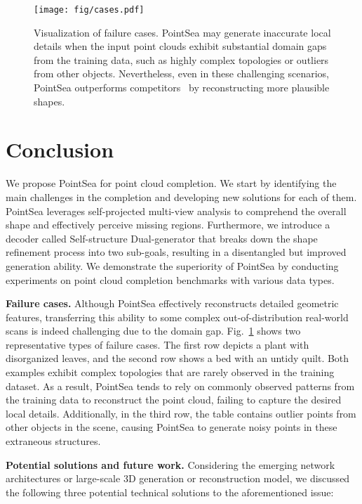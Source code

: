 \begin{figure}[h]
  \centering
  \texttt{[image: fig/cases.pdf]}
\caption{
Visualization of failure cases. PointSea may generate inaccurate local details when the input point clouds exhibit substantial domain gaps from the training data, such as highly complex topologies or outliers from other objects. Nevertheless, even in these challenging scenarios, PointSea outperforms competitors~\citep{chen2023anchorformer,10232862} by reconstructing more plausible shapes.
}
  \label{fig:cases}
\end{figure}


\section{Conclusion}
We propose PointSea for point cloud completion. We start by identifying the main challenges in the completion and developing new solutions for each of them. PointSea leverages self-projected multi-view analysis to comprehend the overall shape and effectively perceive missing regions. Furthermore, we introduce a decoder called Self-structure Dual-generator that breaks down the shape refinement process into two sub-goals, resulting in a disentangled but improved generation ability. We demonstrate the superiority of PointSea by conducting experiments on point cloud completion benchmarks with various data types. 

\noindent \textbf{Failure cases. }
Although PointSea effectively reconstructs detailed geometric features, transferring this ability to some complex out-of-distribution real-world scans is indeed challenging due to the domain gap. 
Fig.~\ref{fig:cases} shows two representative types of failure cases. The first row depicts a plant with disorganized leaves, and the second row shows a bed with an untidy quilt. Both examples exhibit complex topologies that are rarely observed in the training dataset. 
As a result, PointSea tends to rely on commonly observed patterns from the training data to reconstruct the point cloud, failing to capture the desired local details. Additionally, in the third row, the table contains outlier points from other objects in the scene, causing PointSea to generate noisy points in these extraneous structures.

\noindent \textbf{Potential solutions and future work.}
Considering the emerging network architectures or large-scale 3D generation or reconstruction model, we discussed the following three potential technical solutions to the aforementioned issue:

